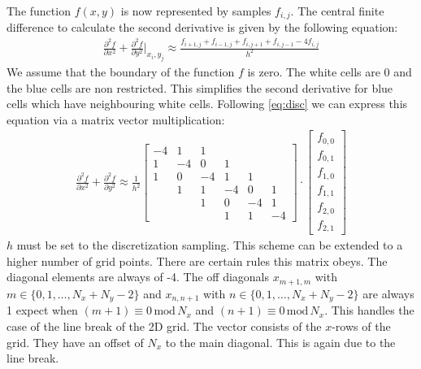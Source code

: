 \documentclass[a4paper,12pt]{scrartcl}
\begin{document}
    The function $f(x, y)$ is now represented by samples $f_{i,j}$.
    The central finite difference to calculate the second derivative is given by the following equation:
    \begin{align}
        \frac{\partial^2 f}{\partial x^2}  + \frac{\partial^2 f}{\partial y^2} \bigg|_{x_i, y_j} \approx 
        \frac{f_{i+1, j} + f_{i-1, j} + f_{i, j+1} + f_{i, j-1} - 4 f_{i, j}}{h^2}
        \label{eq:disc}
    \end{align}
    We assume that the boundary of the function $f$ is zero. The white cells are 0 and the blue cells are non restricted. This simplifies the second derivative for blue cells which have
    neighbouring white cells.
    Following \autoref{eq:disc} we can express this equation via a matrix vector multiplication:
    \begin{align}
        \frac{\partial^2 f}{\partial x^2}  + \frac{\partial^2 f}{\partial y^2}  \approx \frac{1}{h^2}
        \begin{bmatrix}
            -4 & 1  & 1  &    &    & \\ 
             1 & -4 & 0  & 1  &    &  \\
             1 & 0  & -4 & 1  & 1  & \\
               & 1  & 1  & -4 & 0  & 1 \\
               &    & 1  & 0  & -4 & 1 \\
               &    &    & 1  & 1  & -4 
        \end{bmatrix} \cdot       
        \begin{bmatrix}
            f_{0,0} \\ f_{0,1} \\ f_{1,0} \\ f_{1,1 } \\ f_{2,0} \\ f_{2,1} 
        \end{bmatrix}
    \end{align}
    $h$ must be set to the discretization sampling.
    This scheme can be extended to a higher number of grid points. 
    There are certain rules this matrix obeys. The diagonal elements are always of -4.
    The off diagonals $x_{m+1, m}$ with $m \in \{0, 1, \dots, N_x + N_y - 2\}$ 
    and $x_{n, n+1}$ with $n \in \{0, 1, \dots, N_x + N_y - 2\}$ are always 1 expect when
    $(m+1) \equiv 0 \,  \mathrm{mod} \, N_x$ and  $(n+1) \equiv 0 \, \mathrm{mod} \, N_x$. This handles
    the case of the line break of the 2D grid. The vector consists of the $x$-rows of the grid. 
    They have an offset of $N_x$ to the main diagonal. This is again due to the line break. 
\end{document}
